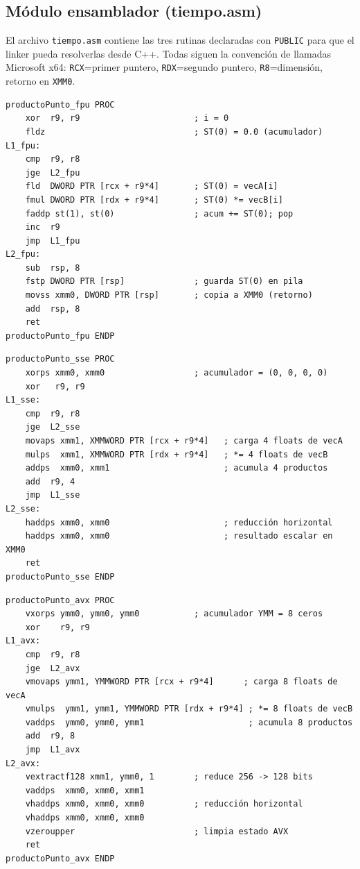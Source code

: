 \documentclass[12pt, letterpaper]{article}
\begin{document}
\subsection{Módulo ensamblador (tiempo.asm)}

El archivo \texttt{tiempo.asm} contiene las tres rutinas declaradas con \texttt{PUBLIC} para que el linker pueda resolverlas desde C++. Todas siguen la convención de llamadas Microsoft x64: \texttt{RCX}=primer puntero, \texttt{RDX}=segundo puntero, \texttt{R8}=dimensión, retorno en \texttt{XMM0}.

\begin{lstlisting}[language=MASM, caption={\texttt{productoPunto\_fpu} — versión FPU x87 (1 float por iteración)}]
productoPunto_fpu PROC
    xor  r9, r9                       ; i = 0
    fldz                              ; ST(0) = 0.0 (acumulador)
L1_fpu:
    cmp  r9, r8
    jge  L2_fpu
    fld  DWORD PTR [rcx + r9*4]       ; ST(0) = vecA[i]
    fmul DWORD PTR [rdx + r9*4]       ; ST(0) *= vecB[i]
    faddp st(1), st(0)                ; acum += ST(0); pop
    inc  r9
    jmp  L1_fpu
L2_fpu:
    sub  rsp, 8
    fstp DWORD PTR [rsp]              ; guarda ST(0) en pila
    movss xmm0, DWORD PTR [rsp]       ; copia a XMM0 (retorno)
    add  rsp, 8
    ret
productoPunto_fpu ENDP
\end{lstlisting}

\begin{lstlisting}[language=MASM, caption={\texttt{productoPunto\_sse} — versión SSE de 128 bits (4 floats por iteración)}]
productoPunto_sse PROC
    xorps xmm0, xmm0                  ; acumulador = (0, 0, 0, 0)
    xor   r9, r9
L1_sse:
    cmp  r9, r8
    jge  L2_sse
    movaps xmm1, XMMWORD PTR [rcx + r9*4]   ; carga 4 floats de vecA
    mulps  xmm1, XMMWORD PTR [rdx + r9*4]   ; *= 4 floats de vecB
    addps  xmm0, xmm1                       ; acumula 4 productos
    add  r9, 4
    jmp  L1_sse
L2_sse:
    haddps xmm0, xmm0                       ; reducción horizontal
    haddps xmm0, xmm0                       ; resultado escalar en XMM0
    ret
productoPunto_sse ENDP
\end{lstlisting}

\begin{lstlisting}[language=MASM, caption={\texttt{productoPunto\_avx} — versión AVX de 256 bits (8 floats por iteración)}]
productoPunto_avx PROC
    vxorps ymm0, ymm0, ymm0           ; acumulador YMM = 8 ceros
    xor    r9, r9
L1_avx:
    cmp  r9, r8
    jge  L2_avx
    vmovaps ymm1, YMMWORD PTR [rcx + r9*4]      ; carga 8 floats de vecA
    vmulps  ymm1, ymm1, YMMWORD PTR [rdx + r9*4] ; *= 8 floats de vecB
    vaddps  ymm0, ymm0, ymm1                     ; acumula 8 productos
    add  r9, 8
    jmp  L1_avx
L2_avx:
    vextractf128 xmm1, ymm0, 1        ; reduce 256 -> 128 bits
    vaddps  xmm0, xmm0, xmm1
    vhaddps xmm0, xmm0, xmm0          ; reducción horizontal
    vhaddps xmm0, xmm0, xmm0
    vzeroupper                        ; limpia estado AVX
    ret
productoPunto_avx ENDP
\end{lstlisting}
\end{document}
